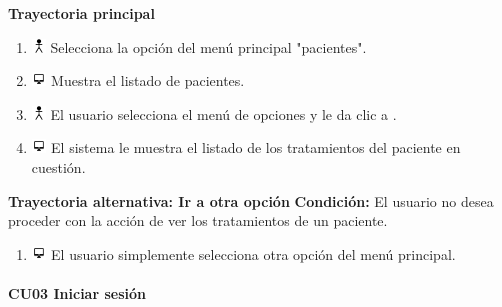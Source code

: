 \textbf{Trayectoria principal}
\begin{enumerate}
\item \includegraphics[height=1em]{pictures/actor.png} Selecciona la opción del menú principal "pacientes".
\item \includegraphics[height=1em]{pictures/sistema.png} Muestra el listado de pacientes.
\item \includegraphics[height=1em]{pictures/actor.png} El usuario selecciona el menú de opciones y le da clic a  .
\item \includegraphics[height=1em]{pictures/sistema.png} El sistema le muestra el listado de los tratamientos del paciente en cuestión.
\end{enumerate} \bigskip

\textbf{Trayectoria alternativa: Ir a otra opción} 
\vspace{0.3em}
\textbf{Condición:} El usuario no desea proceder con la acción de ver los tratamientos de un paciente.
\begin{enumerate}
\item \includegraphics[height=1em]{pictures/sistema.png} El usuario simplemente selecciona otra opción del menú principal.
\end{enumerate} \bigskip



\paragraph{CU03 Iniciar sesión}


